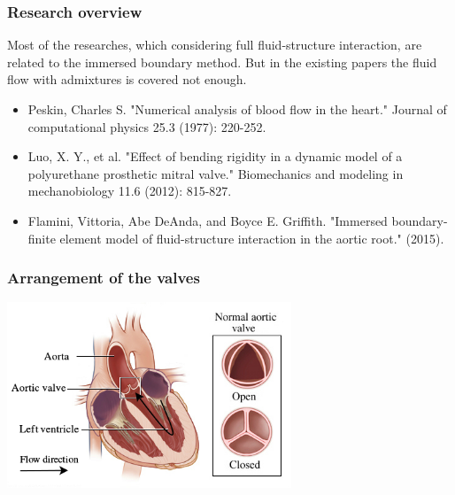 \documentclass[14pt]{beamer}
\begin{document}
\begin{frame}
\frametitle{Research overview}
    Most of the researches, which considering full fluid-structure interaction,
    are related to the immersed boundary method. But in the existing papers the fluid flow
    with admixtures is covered not enough.
    \par
    {\tiny
        \begin{itemize}
            \item[\MVRightarrow] Peskin, Charles S. "Numerical analysis of blood flow in the heart." Journal of computational physics 25.3 (1977): 220-252.
            \item[\MVRightarrow] Luo, X. Y., et al. "Effect of bending rigidity in a dynamic model of a polyurethane prosthetic mitral valve." Biomechanics and modeling in mechanobiology 11.6 (2012): 815-827.
            \item[\MVRightarrow] Flamini, Vittoria, Abe DeAnda, and Boyce E. Griffith. "Immersed boundary-finite element model of fluid-structure interaction in the aortic root." (2015).
        \end{itemize}
    }
\end{frame}

\begin{frame}
\frametitle{Arrangement of the valves}
    \begin{center}
        \includegraphics[width=8.5cm]{aorta_scheme.png}
    \end{center}
\end{frame}
\end{document}

